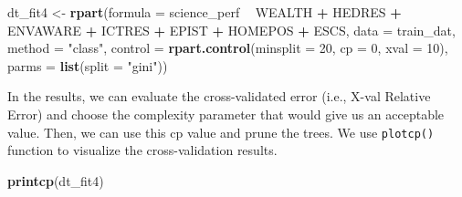 \documentclass[]{book}
\newenvironment{Shaded}{\begin{snugshade}}{\end{snugshade}}
\newcommand{\DataTypeTok}[1]{\textcolor[rgb]{0.13,0.29,0.53}{#1}}
\newcommand{\DecValTok}[1]{\textcolor[rgb]{0.00,0.00,0.81}{#1}}
\newcommand{\KeywordTok}[1]{\textcolor[rgb]{0.13,0.29,0.53}{\textbf{#1}}}
\newcommand{\NormalTok}[1]{#1}
\newcommand{\OperatorTok}[1]{\textcolor[rgb]{0.81,0.36,0.00}{\textbf{#1}}}
\newcommand{\StringTok}[1]{\textcolor[rgb]{0.31,0.60,0.02}{#1}}
\begin{document}
\begin{Shaded}
\begin{Highlighting}[]
\NormalTok{dt_fit4 <-}\StringTok{ }\KeywordTok{rpart}\NormalTok{(}\DataTypeTok{formula =}\NormalTok{ science_perf }\OperatorTok{~}\StringTok{ }\NormalTok{WEALTH }\OperatorTok{+}\StringTok{ }\NormalTok{HEDRES }\OperatorTok{+}\StringTok{ }\NormalTok{ENVAWARE }\OperatorTok{+}\StringTok{ }\NormalTok{ICTRES }\OperatorTok{+}\StringTok{ }
\StringTok{                   }\NormalTok{EPIST }\OperatorTok{+}\StringTok{ }\NormalTok{HOMEPOS }\OperatorTok{+}\StringTok{ }\NormalTok{ESCS,}
                 \DataTypeTok{data =}\NormalTok{ train_dat,}
                 \DataTypeTok{method =} \StringTok{"class"}\NormalTok{, }
                 \DataTypeTok{control =} \KeywordTok{rpart.control}\NormalTok{(}\DataTypeTok{minsplit =} \DecValTok{20}\NormalTok{,}
                                         \DataTypeTok{cp =} \DecValTok{0}\NormalTok{,}
                                         \DataTypeTok{xval =} \DecValTok{10}\NormalTok{),}
                \DataTypeTok{parms =} \KeywordTok{list}\NormalTok{(}\DataTypeTok{split =} \StringTok{"gini"}\NormalTok{))}
\end{Highlighting}
\end{Shaded}

In the results, we can evaluate the cross-validated error (i.e., X-val Relative Error) and choose the complexity parameter that would give us an acceptable value. Then, we can use this cp value and prune the trees. We use \texttt{plotcp()} function to visualize the cross-validation results.

\begin{Shaded}
\begin{Highlighting}[]
\KeywordTok{printcp}\NormalTok{(dt_fit4)}
\end{Highlighting}
\end{Shaded}
\end{document}
